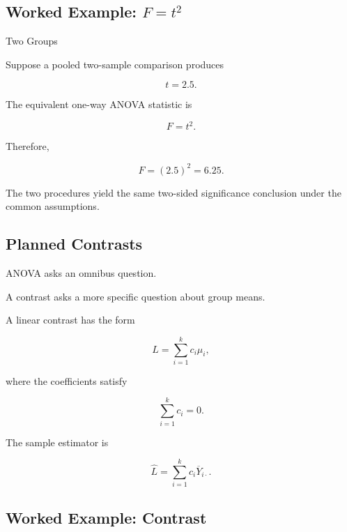\subsection{Worked Example: \(F=t^2\)}
\label{subsec:worked-f-equals-t-square}

\begin{workedexamplebox}{Two Groups}

Suppose a pooled two-sample comparison produces

\[
t=2.5.
\]

The equivalent one-way ANOVA statistic is

\[
F=t^2.
\]

Therefore,

\begin{answerbox}
\[
\boxed{
F
=
(2.5)^2
=
6.25.
}
\]
\end{answerbox}

The two procedures yield the same two-sided significance conclusion under
the common assumptions.

\end{workedexamplebox}

\subsection{Planned Contrasts}
\label{subsec:planned-contrasts}

ANOVA asks an omnibus question.

A contrast asks a more specific question about group means.

A linear contrast has the form

\[
\boxed{
L
=
\sum_{i=1}^{k}
c_i\mu_i,
}
\]

where the coefficients satisfy

\[
\boxed{
\sum_{i=1}^{k}
c_i=0.
}
\]

The sample estimator is

\[
\boxed{
\widehat{L}
=
\sum_{i=1}^{k}
c_i\overline{Y}_{i\cdot}.
}
\]

\subsection{Worked Example: Contrast}
\label{subsec:worked-anova-contrast}

